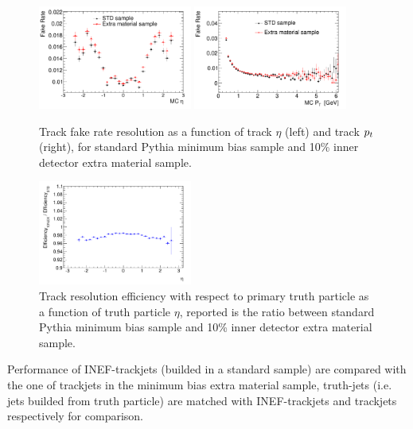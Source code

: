 \begin{figure}[tp]
\centering
\includegraphics[width=0.45\textwidth]{figure/trackjet/T7/trk_fake_etauptade.pdf}
\includegraphics[width=0.45\textwidth]{figure/trackjet/T7/trk_fake_uptade.pdf}
\caption{Track fake rate resolution as a function of track $\eta$ (left) and track $p_{t}$ (right), for
	standard Pythia minimum bias sample and 10\% inner detector extra material sample.}

\label{fig:trk_fakereate}
\end{figure}    

\begin{figure}[tp]
\centering
\includegraphics[width=0.45\textwidth]{figure/trackjet/T7/track_efficiency_ratio.pdf}
\caption{Track resolution efficiency with respect to primary truth particle as a function of truth particle $\eta$, 
	reported is the ratio between standard Pythia minimum bias sample and 10\% inner detector extra material sample.}

\label{fig:trk_eff}
\end{figure}    


Performance of INEF-trackjets (builded in a standard sample) are compared with the one of trackjets in the minimum bias extra material sample,
truth-jets (i.e. jets builded from truth particle) are matched with INEF-trackjets and trackjets respectively for comparison.



